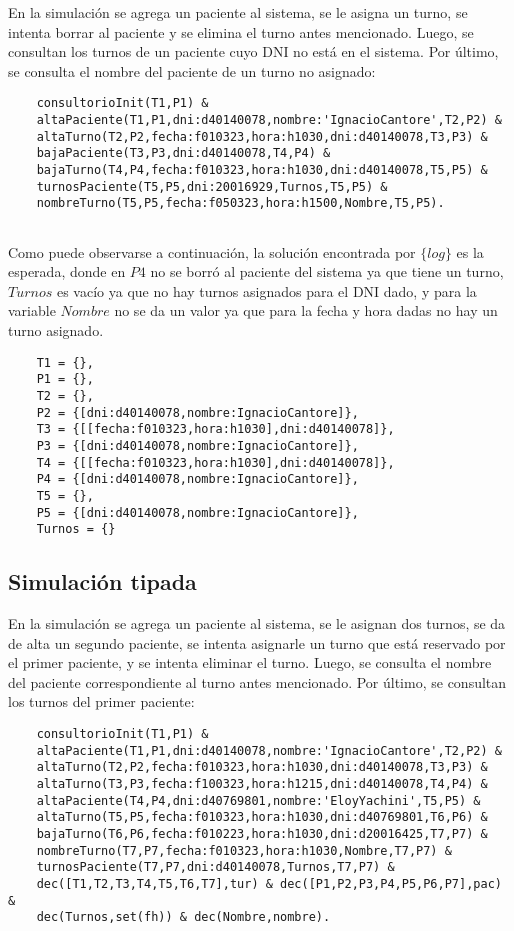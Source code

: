 \documentclass[12pt]{article}
\newcommand{\setlog}{$\{log\}$\xspace}
\begin{document}
En la simulación se agrega un paciente al sistema, se le asigna un turno, se intenta borrar al paciente y se elimina el turno antes mencionado. Luego, se consultan los turnos de un paciente cuyo DNI no está en el sistema. Por último, se consulta el nombre del paciente de un turno no asignado:

\begin{verbatim}
    consultorioInit(T1,P1) &
    altaPaciente(T1,P1,dni:d40140078,nombre:'IgnacioCantore',T2,P2) &
    altaTurno(T2,P2,fecha:f010323,hora:h1030,dni:d40140078,T3,P3) &
    bajaPaciente(T3,P3,dni:d40140078,T4,P4) &
    bajaTurno(T4,P4,fecha:f010323,hora:h1030,dni:d40140078,T5,P5) &
    turnosPaciente(T5,P5,dni:20016929,Turnos,T5,P5) &
    nombreTurno(T5,P5,fecha:f050323,hora:h1500,Nombre,T5,P5).
    
\end{verbatim}

Como puede observarse a continuación, la solución encontrada por \setlog es la esperada, donde en $P4$ no se borró al paciente del sistema ya que tiene un turno, $Turnos$ es vacío ya que no hay turnos asignados para el DNI dado, y para la variable $Nombre$ no se da un valor ya que para la fecha y hora dadas no hay un turno asignado.

\begin{verbatim}
    T1 = {},
    P1 = {},
    T2 = {},
    P2 = {[dni:d40140078,nombre:IgnacioCantore]},
    T3 = {[[fecha:f010323,hora:h1030],dni:d40140078]},
    P3 = {[dni:d40140078,nombre:IgnacioCantore]},
    T4 = {[[fecha:f010323,hora:h1030],dni:d40140078]},
    P4 = {[dni:d40140078,nombre:IgnacioCantore]},
    T5 = {},
    P5 = {[dni:d40140078,nombre:IgnacioCantore]},
    Turnos = {}
\end{verbatim}

\subsection*{Simulación tipada}

En la simulación se agrega un paciente al sistema, se le asignan dos turnos, se da de alta un segundo paciente, se intenta asignarle un turno que está reservado por el primer paciente, y se intenta eliminar el turno. Luego, se consulta el nombre del paciente correspondiente al turno antes mencionado. Por último, se consultan los turnos del primer paciente:

\begin{verbatim}
    consultorioInit(T1,P1) &
    altaPaciente(T1,P1,dni:d40140078,nombre:'IgnacioCantore',T2,P2) &
    altaTurno(T2,P2,fecha:f010323,hora:h1030,dni:d40140078,T3,P3) &
    altaTurno(T3,P3,fecha:f100323,hora:h1215,dni:d40140078,T4,P4) &
    altaPaciente(T4,P4,dni:d40769801,nombre:'EloyYachini',T5,P5) &
    altaTurno(T5,P5,fecha:f010323,hora:h1030,dni:d40769801,T6,P6) &
    bajaTurno(T6,P6,fecha:f010223,hora:h1030,dni:d20016425,T7,P7) &
    nombreTurno(T7,P7,fecha:f010323,hora:h1030,Nombre,T7,P7) &
    turnosPaciente(T7,P7,dni:d40140078,Turnos,T7,P7) &
    dec([T1,T2,T3,T4,T5,T6,T7],tur) & dec([P1,P2,P3,P4,P5,P6,P7],pac) &
    dec(Turnos,set(fh)) & dec(Nombre,nombre).
\end{verbatim}
\end{document}
